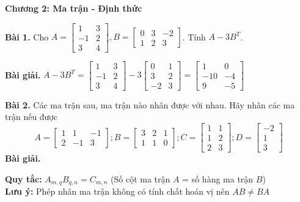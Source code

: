 \documentclass[12pt]{report}
\begin{document}

{\huge \textbf{Chương 2: Ma trận - Định thức}}

\textbf{Bài 1.} 
Cho $A = \begin{bmatrix}
	1 & 3 \\ -1 & 2 \\ 3 & 4
	\end{bmatrix}, B = \begin{bmatrix} 
	0 & 3 & -2 \\ 1 & 2 & 3 \end{bmatrix}$. 
Tính $A - 3B^T$.

\textbf{Bài giải.}
$A - 3B^T = \begin{bmatrix}
	1 & 3 \\ -1 & 2 \\ 3 & 4 
	\end{bmatrix} - 3\begin{bmatrix} 
	0 & 1 \\ 3 & 2 \\ -2 & 3 
	\end{bmatrix} = \begin{bmatrix}
	1 & 0 \\ -10 & -4 \\ 9 & -5 
	\end{bmatrix}$

\textbf{Bài 2.} Các ma trận sau, ma trận nào nhân được với nhau. Hãy nhân các ma trận nếu được 
\[ A = \begin{bmatrix} 1 & 1 & - 1 \\ 2 & -1 & 3 \end{bmatrix}; 
	B = \begin{bmatrix} 3 & 2 & 1 \\ 1 & 1 & 0 \end{bmatrix};
	C = \begin{bmatrix} 1 & 1 \\ 1 & 2 \\ 2 & 3 \end{bmatrix};
	D = \begin{bmatrix} -2 \\ 1 \\ 3 \end{bmatrix} \]
\textbf{Bài giải.}

\textbf{Quy tắc:} $A_{m,q}B_{q,n}=C_{m,n}$ (Số cột ma trận $A$ = số hàng ma trận $B$)\\
\textbf{Lưu ý:} Phép nhân ma trận không có tính chất hoán vị nên $AB \neq BA$
\end{document}
